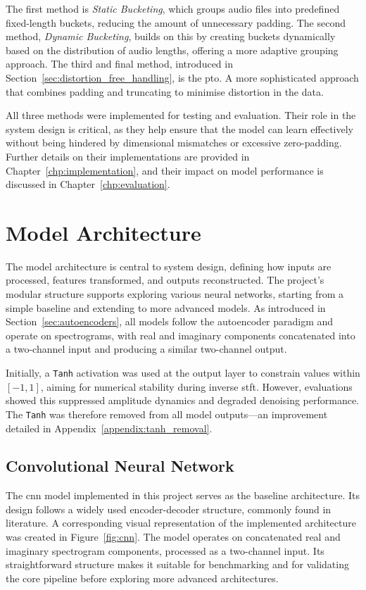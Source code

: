 The first method is \textit{Static Bucketing}, which groups audio files into predefined fixed-length buckets, reducing the amount of unnecessary padding. The second method, \textit{Dynamic Bucketing}, builds on this by creating buckets dynamically based on the distribution of audio lengths, offering a more adaptive grouping approach. The third and final method, introduced in Section~\ref{sec:distortion_free_handling}, is the \gls{pto}. A more sophisticated approach that combines padding and truncating to minimise distortion in the data.

All three methods were implemented for testing and evaluation. Their role in the system design is critical, as they help ensure that the model can learn effectively without being hindered by dimensional mismatches or excessive zero-padding. Further details on their implementations are provided in Chapter~\ref{chp:implementation}, and their impact on model performance is discussed in Chapter~\ref{chp:evaluation}.

\section{Model Architecture}
\label{sec:model_architecture}

The model architecture is central to system design, defining how inputs are processed, features transformed, and outputs reconstructed. The project’s modular structure supports exploring various neural networks, starting from a simple baseline and extending to more advanced models. As introduced in Section~\ref{sec:autoencoders}, all models follow the autoencoder paradigm and operate on spectrograms, with real and imaginary components concatenated into a two-channel input and producing a similar two-channel output.

Initially, a \texttt{Tanh} activation was used at the output layer to constrain values within $[-1, 1]$, aiming for numerical stability during inverse \gls{stft}. However, evaluations showed this suppressed amplitude dynamics and degraded denoising performance. The \texttt{Tanh} was therefore removed from all model outputs—an improvement detailed in Appendix~\ref{appendix:tanh_removal}.

\subsection{Convolutional Neural Network}
\label{sec:cnn}

The \gls{cnn} model implemented in this project serves as the baseline architecture. Its design follows a widely used encoder-decoder structure, commonly found in literature. A corresponding visual representation of the implemented architecture was created in Figure~\ref{fig:cnn}. The model operates on concatenated real and imaginary spectrogram components, processed as a two-channel input. Its straightforward structure makes it suitable for benchmarking and for validating the core pipeline before exploring more advanced architectures.

